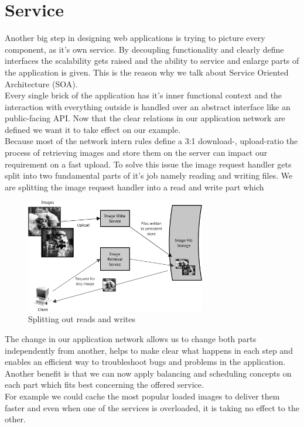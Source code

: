 \documentclass[12p]{article}
\begin{document}
	\section{Service}
	Another big step in designing web applications is trying to picture every component, as it's own service. By decoupling functionality and clearly define interfaces the scalability gets raised and the ability to service and enlarge parts of the application is given. This is the reason why we talk about Service Oriented Architecture (\gls{SOA}).\\
	Every single brick of the application has it's inner functional context and the interaction with everything outside is handled over an abstract interface like an public-facing \gls{API}.
	\newpage
	Now that the clear relations in our application network are defined we want it to take effect on our example.\\
	Because most of the network intern rules define a 3:1 download-, upload-ratio the process of retrieving images and store them on the server can impact our requirement on a fast upload. To solve this issue the image request handler gets split into two fundamental parts of it's job namely reading and writing files.
	We are splitting the image request handler into a read and write part which 
	\begin{figure}[h!]
		\centering
		\includegraphics[width=0.7\textwidth]{img/appLayerImage2.png}
		\caption{Splitting out reads and writes \cite{cache}}
	\end{figure}
	The change in our application network allows us to change both parts independently from another, helps to make clear what happens in each step and enables an efficient way to troubleshoot bugs and problems in the application.\\
	Another benefit is that we can now apply balancing and scheduling concepts on each part which fits best concerning the offered service.\\
	For example we could cache the most popular loaded images to deliver them faster and even when one of the services is overloaded, it is taking no effect to the other.
	
\end{document}
